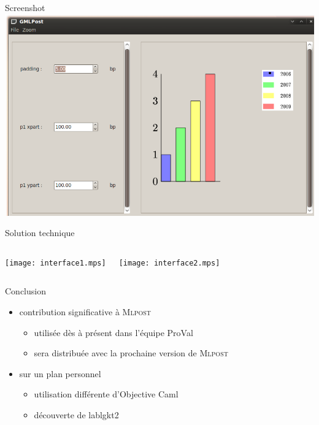 \documentclass{beamer}
\newcommand{\mlpost}{\textsc{Mlpost}}
\begin{document}
\begin{frame}{Screenshot}
\includegraphics[scale=0.4]{screen2.png}
\end{frame}


\begin{frame}{Solution technique}
  \begin{columns}
    \begin{center}
      \texttt{[image: interface1.mps]}
    \end{center}
    \begin{center}
      \texttt{[image: interface2.mps]}
    \end{center}
  \end{columns}
\end{frame}

\begin{frame}{Conclusion}
  \begin{itemize}
  \item contribution significative à \mlpost
    \begin{itemize}
    \item<1-> utilisée dès à présent dans l'équipe ProVal
    \item<2-> sera distribuée avec la prochaine version de \mlpost
    \end{itemize}

    \bigskip
  \item sur un plan personnel
    \begin{itemize}
      \item<3-> utilisation différente d'Objective Caml
      \item<4-> découverte de lablgkt2
    \end{itemize}
  \end{itemize}
\end{frame}
\end{document}
